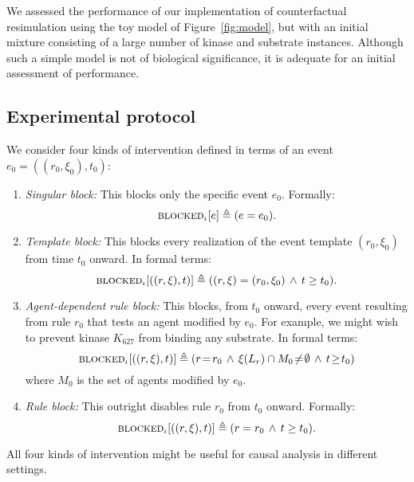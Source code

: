
\newcommand{\subs}[2]{#1_{\textsf{#2}}}

We assessed the performance of our implementation of counterfactual
resimulation using the toy model of Figure~\ref{fig:model}, but with an initial
mixture consisting of a large number of kinase and substrate instances. Although
such a simple model is not of biological significance, it is adequate for an
initial assessment of performance.

\subsection{Experimental protocol}

We consider four kinds of intervention defined in terms of an event
$e_0=((r_0, \xi_0), t_0)$:
\begin{enumerate}[leftmargin=0.4cm]
\item \textit{Singular block:} This blocks only the specific event $e_0$. Formally: 
\[{\textsc{blocked}}_{\iota}[e] \triangleq (e = e_0).\]
\item \textit{Template block:} This blocks every realization of the event template $(r_0, \xi_0)$ from time $t_0$ onward. In formal terms:
\[{\textsc{blocked}}_{\iota}[((r, \xi), t)] \triangleq ((r, \xi) = (r_0, \xi_0)
\,\wedge\, t \geq t_0).\]
\item \textit{Agent-dependent rule block:} This blocks, from
$t_0$ onward, every event resulting from rule $r_0$ that tests an agent
modified by $e_0$. For example, we might wish to prevent kinase $K_{627}$ from binding any substrate. In formal terms: \[{\textsc{blocked}}_{\iota}[((r, \xi), t)] \triangleq (r \!=\! r_0 \,\wedge\, \xi(L_r)\cap M_0 \!\neq\! \emptyset \,\wedge\, t \!\geq\! t_0)\] where $M_0$ is the set of agents modified by $e_0$.
\item \textit{Rule block:} This outright disables rule
$r_0$ from $t_0$ onward. Formally: \[{\textsc{blocked}}_{\iota}[((r, \xi), t)] \triangleq (r = r_0 \,\wedge\, t \geq t_0).\]
\end{enumerate}
All four kinds of intervention might be useful for causal analysis in
different settings.

